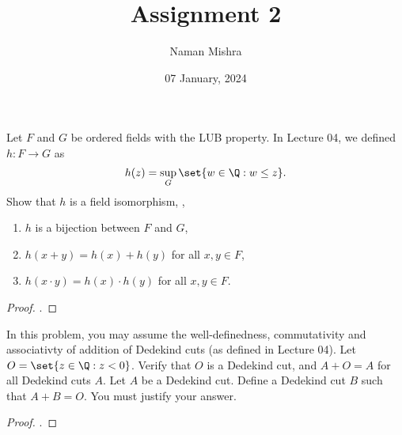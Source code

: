 \documentclass[12pt]{article}
\title{Assignment 2}
\author{Naman Mishra}
\date{07 January, 2024}
\begin{document}
\maketitle
\begin{problem}
    Let $F$ and $G$ be ordered fields with the LUB property.
    In Lecture 04, we defined $h\colon F \to G$ as \[
        h(z) = \sup_G\set{w \in \Q : w \le z}.
    \] Show that $h$ is a field isomorphism, \ie,
    \begin{enumerate}[label=(\arabic*)]
        \item $h$ is a bijection between $F$ and $G$,
        \item $h(x + y) = h(x) + h(y)$ for all $x, y \in F$,
        \item $h(x \cdot y) = h(x) \cdot h(y)$ for all $x, y \in F$.
    \end{enumerate}
\end{problem}
\begin{proof}
    .
\end{proof}

\begin{problem}
    In this problem, you may assume the well-definedness, commutativity and
    associativty of addition of Dedekind cuts (as defined in Lecture 04).
    Let $O = \set{z \in \Q : z < 0}$.
    Verify that $O$ is a Dedekind cut, and $A + O = A$ for all Dedekind cuts
    $A$.
    Let $A$ be a Dedekind cut.
    Define a Dedekind cut $B$ such that $A + B = O$.
    You must justify your answer.
\end{problem}
\begin{proof}
    .
\end{proof}
\end{document}
